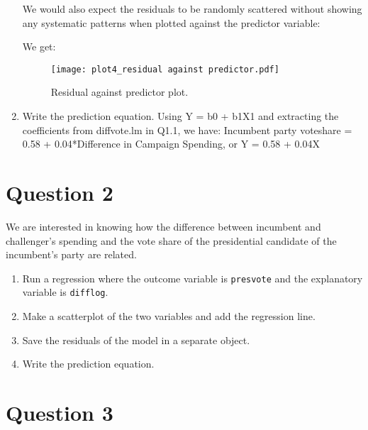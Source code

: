\documentclass[12pt,letterpaper]{article}
\begin{document}
\begin{enumerate}
\begin{figure}[hbtp!]
\end{figure}
\noindent We would also expect the residuals to be randomly scattered without showing any  systematic patterns when plotted against the predictor variable:
\vspace{.5cm}
  
\vspace{.5cm}  
\noindent We get:
\begin{figure}[hbtp!]\centering
	\caption{\footnotesize Residual against predictor plot.}
	\label{fig:plot_4}
	\texttt{[image: plot4\_residual against predictor.pdf]}
\end{figure}
		\item Write the prediction equation.
\noindent Using Y = b0 + b1X1 and extracting the coefficients from diffvote.lm in Q1.1, we have:
Incumbent party voteshare = 0.58 + 0.04*Difference in Campaign Spending, or Y = 0.58 + 0.04X
	\end{enumerate}
	
\newpage

\section*{Question 2}
\noindent We are interested in knowing how the difference between incumbent and challenger's spending and the vote share of the presidential candidate of the incumbent's party are related.	\vspace{.25cm}
	\begin{enumerate}
		\item Run a regression where the outcome variable is \texttt{presvote} and the explanatory variable is \texttt{difflog}.	\vspace{5cm}
		\item Make a scatterplot of the two variables and add the regression line. 	\vspace{5cm}
		\item Save the residuals of the model in a separate object.	\vspace{5cm}
		\item Write the prediction equation.
	\end{enumerate}
	
	\newpage	
\section*{Question 3}
\end{document}
